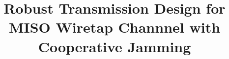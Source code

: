 \documentclass[12pt,journal,draftclsnofoot,onecolumn]{IEEEtran}
\begin{document}
%
\title{Robust Transmission Design for MISO Wiretap Channnel with Cooperative Jamming}



\author{
}


% 
\end{document}
